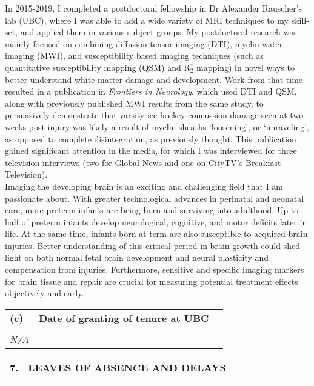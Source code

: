 \documentclass[11pt,notitlepage,english]{report}
\begin{document}
In 2015-2019, I completed a postdoctoral fellowship in Dr Alexander Rauscher’s lab (UBC), where I was able to add a wide variety of MRI techniques to my skill-set, and applied them in various subject groups. My postdoctoral research was mainly focused on combining diffusion tensor imaging (DTI), myelin water imaging (MWI), and susceptibility based imaging techniques (such as quantitative susceptibility mapping (QSM) and R$_{2}^{*}$ mapping) in novel ways to better understand white matter damage and development. Work from that time resulted in a publication in \textit{Frontiers in Neurology},  which used DTI and QSM, along with previously published MWI results from the same study, to persuasively demonstrate that varsity ice-hockey concussion damage seen at two-weeks post-injury was likely a result of myelin sheaths ‘loosening’, or ‘unraveling’, as opposed to complete disintegration, as previously thought. This publication gained significant attention in the media, for which I was interviewed for three television interviews (two for Global News and one on CityTV’s Breakfast Television).
\\

Imaging the developing brain is an exciting and challenging field that I am passionate about. With greater technological advances in perinatal and neonatal care, more preterm infants are being born and surviving into adulthood. Up to half of preterm infants develop neurological, cognitive, and motor deficits later in life. At the same time, infants born at term are also susceptible to acquired brain injuries. Better understanding of this critical period in brain growth could shed light on both normal fetal brain development and neural plasticity and compensation from injuries. Furthermore, sensitive and specific imaging markers for brain tissue and repair are crucial for measuring potential treatment effects objectively and early.

\vspace{5pt}
\begin{tabular}{L{.5cm} L{8cm} L{6.9cm}}
  \textbf{(c)} & \textbf{Date of granting of tenure at UBC} \\
  \\
  \textit{N/A}                                              \\
\end{tabular}


\vspace{5pt}
\begin{tabular}{L{.5cm} L{8cm} L{6.9cm}}
  \textbf{7.} & \textbf{LEAVES OF ABSENCE AND DELAYS} \\
  \\
\end{tabular}
\end{document}
